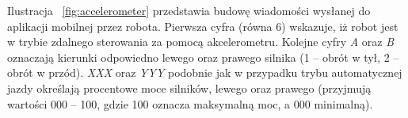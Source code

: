 Ilustracja ~\ref{fig:accelerometer} przedstawia budowę wiadomości wysłanej do aplikacji mobilnej przez robota. Pierwsza cyfra (równa 6) wskazuje, iż robot jest w trybie zdalnego sterowania za pomocą akcelerometru. Kolejne cyfry \textit{A} oraz \textit{B} oznaczają kierunki odpowiedno lewego oraz prawego silnika (1 – obrót w tył, 2 – obrót w przód). \textit{XXX} oraz \textit{YYY} podobnie jak w przypadku trybu automatycznej jazdy określają procentowe moce silników, lewego oraz prawego (przyjmują wartości 000 – 100, gdzie 100 oznacza maksymalną moc, a 000 minimalną).  

